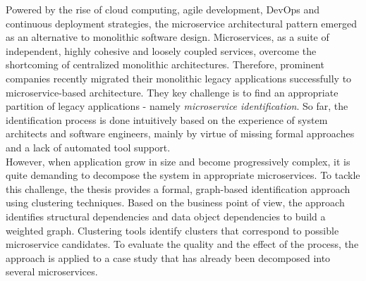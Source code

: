 

\Abstract
Powered by the rise of cloud computing, agile development, DevOps and continuous deployment strategies, the microservice architectural pattern emerged as an alternative to monolithic software design. Microservices, as a suite of independent, highly cohesive and loosely coupled services, overcome the shortcoming of centralized monolithic architectures. Therefore, prominent companies recently migrated their monolithic legacy applications successfully to microservice-based architecture. They key challenge is to find an appropriate partition of legacy applications - namely \textit{microservice identification}. So far, the identification process is done intuitively based on the experience of system architects and software engineers, mainly by virtue of missing formal approaches and a lack of automated tool support. \\
However, when application grow in size and become progressively complex, it is quite demanding to decompose the system in appropriate microservices.
To tackle this challenge, the thesis provides a formal, graph-based identification approach using clustering techniques. Based on the business point of view, the approach identifies structural dependencies and data object dependencies to build a weighted graph. Clustering tools identify clusters that correspond to possible microservice candidates. To evaluate the quality and the effect of the process, the approach is applied to a case study that has already been decomposed into several microservices. 



